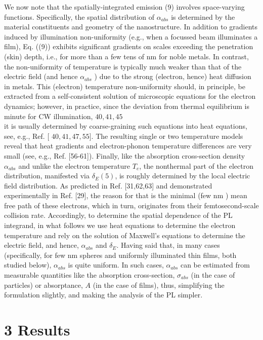 \documentclass[10pt]{article}
\begin{document}
We now note that the spatially-integrated emission (9) involves space-varying functions. Specifically, the spatial distribution of $\alpha_{a b s}$ is determined by the material constituents and geometry of the nanostructure. In addition to gradients induced by illumination non-uniformity (e.g., when a focussed beam illuminates a film), Eq. ((9)) exhibits significant gradients on scales exceeding the penetration (skin) depth, i.e., for more than a few tens of nm for noble metals. In contrast, the non-uniformity of temperature is typically much weaker than that of the electric field (and hence $\alpha_{a b s}$ ) due to the strong (electron, hence) heat diffusion in metals. This (electron) temperature non-uniformity should, in principle, be extracted from a self-consistent solution of microscopic equations for the electron dynamics; however, in practice, since the deviation from thermal equilibrium is minute for CW illumination, $40,41,45$\\
it is usually determined by coarse-graining such equations into heat equations, see, e.g., Ref. [ $40,41,47,55]$. The resulting single or two temperature models reveal that heat gradients and electron-phonon temperature differences are very small (see, e.g., Ref. [56-61]). Finally, like the absorption cross-section density $\alpha_{a b s}$ and unlike the electron temperature $T_{e}$, the nonthermal part of the electron distribution, manifested via $\delta_{E}(5)$, is roughly determined by the local electric field distribution. As predicted in Ref. [31,62,63] and demonstrated experimentally in Ref. [29], the reason for that is the minimal (few nm ) mean free path of these electrons, which in turn, originates from their femtosecond-scale collision rate. Accordingly, to determine the spatial dependence of the PL integrand, in what follows we use heat equations to determine the electron temperature and rely on the solution of Maxwell's equations to determine the electric field, and hence, $\alpha_{a b s}$ and $\delta_{E}$. Having said that, in many cases (specifically, for few nm spheres and uniformly illuminated thin films, both studied below), $\alpha_{a b s}$ is quite uniform. In such cases, $\alpha_{a b s}$ can be estimated from measurable quantities like the absorption cross-section, $\sigma_{a b s}$ (in the case of particles) or absorptance, $A$ (in the case of films), thus, simplifying the formulation slightly, and making the analysis of the PL simpler.

\section*{3 Results}
\end{document}
